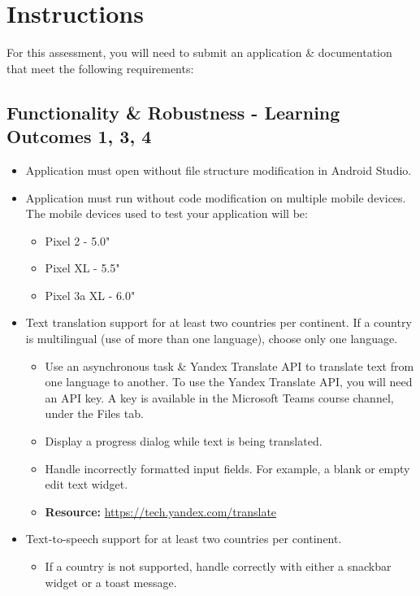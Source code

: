 \documentclass{article}
\begin{document}
\section*{Instructions} 
For this assessment, you will need to submit an application \& documentation that meet the following requirements:

\subsection*{Functionality \& Robustness - Learning Outcomes 1, 3, 4}
\begin{itemize}
    \item Application must open without file structure modification in Android Studio.
    \item Application must run without code modification on multiple mobile devices. The mobile devices used to test your application will be:
    \begin{itemize}
        \item Pixel 2 - 5.0"
        \item Pixel XL - 5.5"
        \item Pixel 3a XL - 6.0"
    \end{itemize}
    \item Text translation support for at least two countries per continent. If a country is multilingual (use of more than one language), choose only one language. 
    \begin{itemize}
        \item Use an asynchronous task \& Yandex Translate API to translate text from one language to another. To use the Yandex Translate API, you will need an API key. A key is available in the Microsoft Teams course channel, under the Files tab.
        \item Display a progress dialog while text is being translated. 
        \item Handle incorrectly formatted input fields. For example, a blank or empty edit text widget.
        \item \textbf{Resource:} \footnotesize\href{https://tech.yandex.com/translate}{https://tech.yandex.com/translate}
    \end{itemize}
    \item Text-to-speech support for at least two countries per continent. 
    \begin{itemize}
        \item If a country is not supported, handle correctly with either a snackbar widget or a toast message.

\end{itemize}
\end{itemize}
\end{document}
